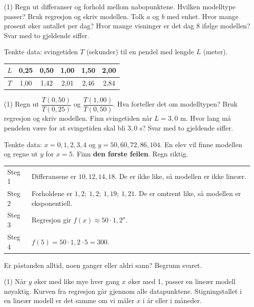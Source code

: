 \begin{tasks}(1)
  \task Regn ut differanser og forhold mellom nabopunktene. Hvilken modelltype passer?
  \task Bruk regresjon og skriv modellen.
  \task Tolk $a$ og $b$ med enhet. Hvor mange prosent øker antallet per dag?
  \task Hvor mange visninger er det dag 8 ifølge modellen? Svar med to gjeldende siffer.
\end{tasks}

Tenkte data: svingetiden $T$ (sekunder) til en pendel med lengde $L$ (meter).

\smallskip
\begin{tabular}{@{}c|ccccc@{}}
$L$ & 0,25 & 0,50 & 1,00 & 1,50 & 2,00\\ \hline
$T$ & 1,00 & 1,42 & 2,01 & 2,46 & 2,84\\
\end{tabular}

\begin{tasks}(1)
  \task Regn ut $\dfrac{T(0{,}50)}{T(0{,}25)}$ og $\dfrac{T(1{,}00)}{T(0{,}50)}$. Hva forteller det om modelltypen?
  \task Bruk regresjon og skriv modellen.
  \task Finn svingetiden når $L = 3{,}0$ m.
  \task Hvor lang må pendelen være for at svingetiden skal bli $3{,}0$ s? Svar med to gjeldende siffer.
\end{tasks}

Tenkte data: $x = 0, 1, 2, 3, 4$ og $y = 50, 60, 72, 86, 104$. En elev vil finne modellen og regne ut $y$ for $x = 5$.
Finn \textbf{den første feilen}. Regn riktig.

\smallskip
\begin{tabular}{@{}l p{14cm}@{}}
Steg 1 & Differansene er $10, 12, 14, 18$. De er ikke like, så modellen er ikke lineær.\\
Steg 2 & Forholdene er $1{,}2;\ 1{,}2;\ 1{,}19;\ 1{,}21$. De er omtrent like, så modellen er eksponentiell.\\
Steg 3 & Regresjon gir $f(x) \approx 50 \cdot 1{,}2^x$.\\
Steg 4 & $f(5) = 50 \cdot 1{,}2 \cdot 5 = 300$.\\
\end{tabular}


Er påstanden alltid, noen ganger eller aldri sann? Begrunn svaret.
\begin{tasks}(1)
  \task Når $y$ øker med like mye hver gang $x$ øker med 1, passer en lineær modell nøyaktig.
  \task Kurven fra regresjon går gjennom alle datapunktene.
  \task Stigningstallet i en lineær modell er det samme om vi måler $x$ i år eller i måneder.
\end{tasks}

